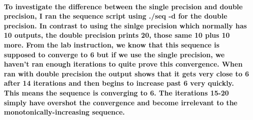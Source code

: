 \documentclass{article}
\begin{document}
    \paragraph{To investigate the difference between the single precision and double precision, I ran the sequence script using ./seq -d for the double precision. In contrast to using the sinlge precision which normally has 10 outputs, the double precision prints 20, those same 10 plus 10 more. From the lab instruction, we know that this sequence is supposed to converge to 6 but if we use the single precision, we haven't ran enough iterations to quite prove this convergence. When ran with double precision the output shows that it gets very close to 6 after 14 iterations and then begins to increase past 6 very quickly. This means the sequence is converging to 6. The iterations 15-20 simply have overshot the convergence and become irrelevant to the monotonically-increasing sequence.}
\end{document}
